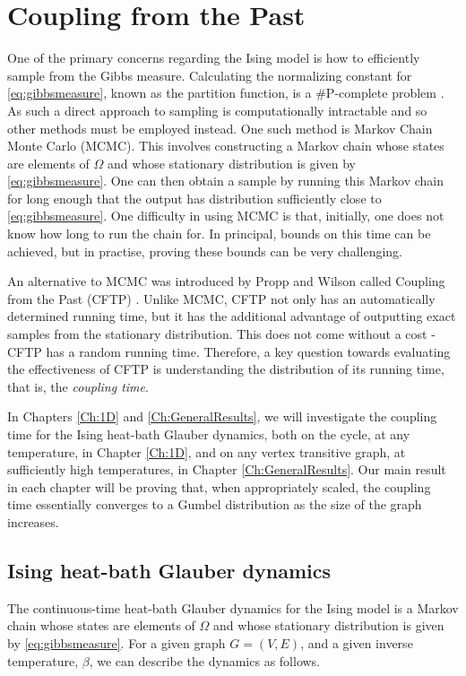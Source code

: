 
\section{Coupling from the Past}
	One of the primary concerns regarding the Ising model is how to efficiently sample from the Gibbs measure. Calculating the normalizing constant for \eqref{eq:gibbsmeasure}, known as the partition function, is a \#P-complete problem \cite{Jerrum1993-ii}. As such a direct approach to sampling is computationally intractable and so other methods must be employed instead. One such method is Markov Chain Monte Carlo (MCMC). This involves constructing a Markov chain whose states are elements of $\Omega$ and whose stationary distribution is given by \eqref{eq:gibbsmeasure}. One can then obtain a sample by running this Markov chain for long enough that the output has distribution sufficiently close to \eqref{eq:gibbsmeasure}.
	One difficulty in using MCMC is that, initially, one does not know how long to run the chain for. In principal, bounds on this time can be achieved, but in practise, proving these bounds can be very challenging.

	An alternative to MCMC was introduced by Propp and Wilson called Coupling from the Past (CFTP) \cite{Propp1996-cf}. Unlike MCMC, CFTP not only has an automatically determined running time, but it has the additional advantage of outputting exact samples from the stationary distribution. This does not come without a cost - CFTP has a random running time. Therefore, a key question towards evaluating the effectiveness of CFTP is understanding the distribution of its running time, that is, the \emph{coupling time}.

	In Chapters \ref{Ch:1D} and \ref{Ch:GeneralResults}, we will investigate the coupling time for the Ising heat-bath Glauber dynamics, both on the cycle, at any temperature, in Chapter \ref{Ch:1D}, and on any vertex transitive graph, at sufficiently high temperatures, in Chapter \ref{Ch:GeneralResults}. Our main result in each chapter will be proving that, when appropriately scaled, the coupling time essentially converges to a Gumbel distribution as the size of the graph increases. 

	\subsection{Ising heat-bath Glauber dynamics}
	\label{sec:heat-bath glauber dynamics definition}
	The continuous-time heat-bath Glauber dynamics for the Ising model is a Markov chain whose states are elements of $\Omega$ and whose stationary distribution is given by \eqref{eq:gibbsmeasure}. For a given graph $G = (V, E)$, and a given inverse temperature, $\beta$, we can describe the dynamics as follows. 

